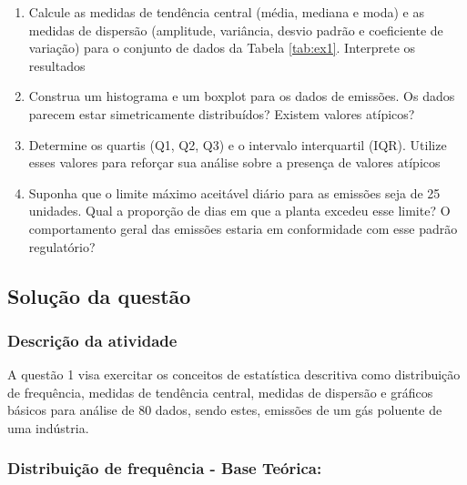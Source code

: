 \documentclass[a4paper,11pt]{article}
\begin{document}
\begin{enumerate}[leftmargin=*]
\item Calcule as medidas de tendência central (média, mediana e moda) e as medidas de
dispersão (amplitude, variância, desvio padrão e coeficiente de variação) para o conjunto de dados da Tabela \ref{tab:ex1}.  Interprete os resultados

\item Construa um histograma e um boxplot para os dados de emissões. Os dados parecem
estar simetricamente distribuídos? Existem valores atípicos?

\item Determine os quartis (Q1, Q2, Q3) e o intervalo interquartil (IQR). Utilize esses valores
para reforçar sua análise sobre a presença de valores atípicos

\item Suponha que o limite máximo aceitável diário para as emissões seja de 25 unidades.
Qual a proporção de dias em que a planta excedeu esse limite? O comportamento
geral das emissões estaria em conformidade com esse padrão regulatório? 

\end{enumerate} 


\subsection*{Solução da questão} 			

\subsubsection*{Descrição da atividade}
A questão 1 visa exercitar os conceitos de estatística descritiva como distribuição de frequência, medidas de tendência central, medidas de dispersão e gráficos básicos para análise de 80 dados, sendo estes, emissões de um gás poluente de uma indústria. 

\subsubsection*{Distribuição de frequência - Base Teórica:} 
\end{document}
